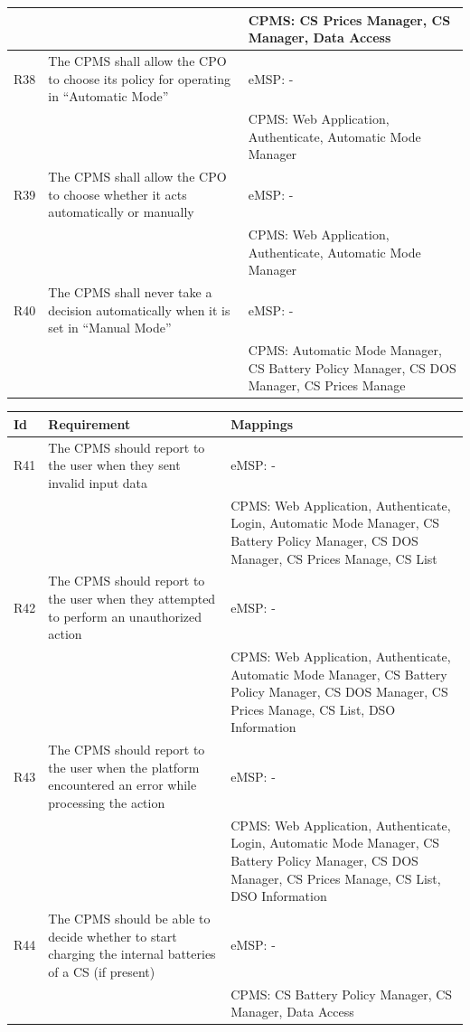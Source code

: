 \documentclass[11pt]{article}
\begin{document}
\begin{table}[H]
\begin{tabularx}{\textwidth}{|>{\centering\hsize=0.15\hsize}X|>{\hsize=1.425\hsize}X|>{\hsize=1.425\hsize}X|}
        & & CPMS: CS Prices Manager, CS Manager, Data Access \\
        \hline
        R38 & The CPMS shall allow the CPO to choose its policy for operating in “Automatic Mode” & eMSP: - \\
        & & CPMS: Web Application, Authenticate, Automatic Mode Manager \\
        \hline
        R39 & The CPMS shall allow the CPO to choose whether it acts automatically or manually & eMSP: - \\
        & & CPMS: Web Application, Authenticate, Automatic Mode Manager \\
        \hline
        R40 & The CPMS shall never take a decision automatically when it is set in “Manual Mode” & eMSP: - \\
        & & CPMS: Automatic Mode Manager, CS Battery Policy Manager, CS DOS Manager, CS Prices Manage \\
        \hline
    \end{tabularx}
    \label{tab:requirements}
\end{table}

\begin{table}[H]
    \centering
    \setlength{\tabcolsep}{18pt}
    \renewcommand{\arraystretch}{1.2}
    \begin{tabularx}{\textwidth}{|>{\centering\hsize=0.15\hsize}X|>{\hsize=1.425\hsize}X|>{\hsize=1.425\hsize}X|}
        \hline
        \textbf{Id} & \textbf{Requirement} & \textbf{Mappings} \\
        \hline
        R41 & The CPMS should report to the user when they sent invalid input data & eMSP: - \\
        & & CPMS: Web Application, Authenticate, Login, Automatic Mode Manager, CS Battery Policy Manager, CS DOS Manager, CS Prices Manage, CS List \\
        \hline
        R42 & The CPMS should report to the user when they attempted to perform an unauthorized action & eMSP: - \\
        & & CPMS: Web Application, Authenticate, Automatic Mode Manager, CS Battery Policy Manager, CS DOS Manager, CS Prices Manage, CS List, DSO Information \\
        \hline
        R43 & The CPMS should report to the user when the platform encountered an error while processing the action & eMSP: - \\
        & & CPMS: Web Application, Authenticate, Login, Automatic Mode Manager, CS Battery Policy Manager, CS DOS Manager, CS Prices Manage, CS List, DSO Information \\
        \hline
        R44 & The CPMS should be able to decide whether to start charging the internal batteries of a CS (if present) & eMSP: - \\
        & & CPMS: CS Battery Policy Manager, CS Manager, Data Access \\
        \hline
    \end{tabularx}
    \label{tab:requirements-2}
\end{table}
\end{document}
